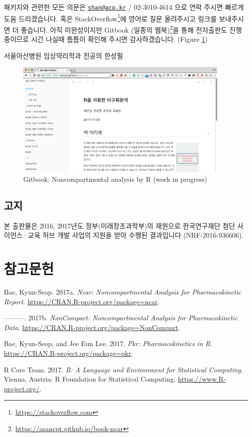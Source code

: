 \documentclass[9pt,]{krantz}
\begin{document}
패키지와 관련한 모든 의문은
\href{mailto:shan@acp.kr}{\nolinkurl{shan@acp.kr}} / 02-3010-4614 으로
연락 주시면 빠르게 도움 드리겠습니다. 혹은 StackOverflow\footnote{\url{https://stackoverflow.com}}에
영어로 질문 올려주시고 링크를 보내주시면 더 좋습니다. 아직 미완성이지만
Gitbook (일종의 웹북)\footnote{\url{https://asancpt.github.io/book-ncar}}을
통해 전자출판도 진행 중이므로 시간 나실때 틈틈이 확인해 주시면
감사하겠습니다. (Figure \ref{fig:gitbook})

서울아산병원 임상약리학과 전공의 한성필

\begin{figure}
\includegraphics[width=400px]{assets/gitbook} \caption{Gitbook: Noncompartmental analysis by R (work in progress)}\label{fig:gitbook}
\end{figure}

\section{고지}

본 출판물은 2016, 2017년도 정부(미래창조과학부)의 재원으로 한국연구재단
첨단 사이언스·교육 허브 개발 사업의 지원을 받아 수행된 결과입니다
(NRF-2016-936606).

\chapter{참고문헌}\label{references}

\hypertarget{refs}{}
\hypertarget{ref-R-ncar}{}
Bae, Kyun-Seop. 2017a. \emph{Ncar: Noncompartmental Analysis for
Pharmacokinetic Report}. \url{https://CRAN.R-project.org/package=ncar}.

\hypertarget{ref-R-NonCompart}{}
---------. 2017b. \emph{NonCompart: Noncompartmental Analysis for
Pharmacokinetic Data}.
\url{https://CRAN.R-project.org/package=NonCompart}.

\hypertarget{ref-R-pkr}{}
Bae, Kyun-Seop, and Jee Eun Lee. 2017. \emph{Pkr: Pharmacokinetics in
R}. \url{https://CRAN.R-project.org/package=pkr}.

\hypertarget{ref-R-base}{}
R Core Team. 2017. \emph{R: A Language and Environment for Statistical
Computing}. Vienna, Austria: R Foundation for Statistical Computing.
\url{https://www.R-project.org/}.
\end{document}
